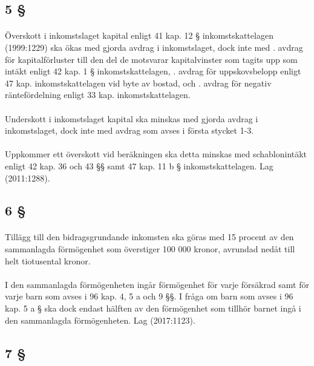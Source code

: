 \documentclass[a4paper,notitlepage,openany,10pt]{book}
\begin{document}
\subsection*{5 §}
\paragraph*{}
Överskott i inkomstslaget kapital enligt 41 kap. 12 § inkomstskattelagen (1999:1229) ska ökas med gjorda avdrag i inkomstslaget, dock inte med
. avdrag för kapitalförluster till den del de motsvarar kapitalvinster som tagits upp som intäkt enligt 42 kap. 1 § inkomstskattelagen,
. avdrag för uppskovsbelopp enligt 47 kap. inkomstskattelagen vid byte av bostad, och
. avdrag för negativ räntefördelning enligt 33 kap.
inkomstskattelagen.
\paragraph*{}
Underskott i inkomstslaget kapital ska minskas med gjorda avdrag i inkomstslaget, dock inte med avdrag som avses i första stycket 1-3.
\paragraph*{}
Uppkommer ett överskott vid beräkningen ska detta minskas med schablonintäkt enligt 42 kap. 36 och 43 §§ samt 47 kap. 11 b § inkomstskattelagen.
Lag (2011:1288).
\subsection*{6 §}
\paragraph*{}
Tillägg till den bidragsgrundande inkomsten ska göras med 15 procent av den sammanlagda förmögenhet som överstiger 100 000 kronor, avrundad nedåt till helt tiotusental kronor.
\paragraph*{}
I den sammanlagda förmögenheten ingår förmögenhet för varje försäkrad samt för varje barn som avses i 96 kap. 4, 5 a och 9 §§. I fråga om barn som avses i 96 kap. 5 a § ska dock endast hälften av den förmögenhet som tillhör barnet ingå i den sammanlagda förmögenheten.
Lag (2017:1123).
\subsection*{7 §}
\end{document}
